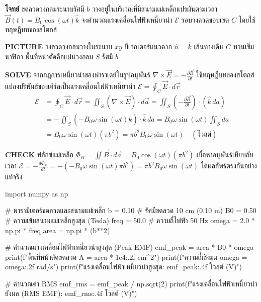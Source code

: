 \begin{mathexample}
\textbf{โจทย์} ขดลวดวงกลมระนาบรัศมี $b$ วางอยู่ในบริเวณที่มีสนามแม่เหล็กแปรผันตามเวลา $\vec{B}(t) = B_0 \cos(\omega t) \hat{k}$ จงคำนวณแรงเคลื่อนไฟฟ้าเหนี่ยวนำ $\mathcal{E}$ รอบวงลวดขอบเขต $C$ โดยใช้ทฤษฎีบทของสโตกส์

\vspace{0.2cm}
\textbf{PICTURE} วงลวดวงกลมวางในระนาบ $xy$ มีเวกเตอร์แนวฉาก $\hat{n} = \hat{k}$ เส้นทางเดิน $C$ ทวนเข็มนาฬิกา พื้นที่หน้าตัดคือแผ่นวงกลม $S$ รัศมี $b$

\vspace{0.2cm}
\textbf{SOLVE}
จากกฎการเหนี่ยวนำของฟาราเดย์ในรูปอนุพันธ์ $\nabla \times \vec{E} = -\frac{\partial \vec{B}}{\partial t}$
ใช้ทฤษฎีบทของสโตกส์แปลงปริพันธ์ของเคิร์ลเป็นแรงเคลื่อนไฟฟ้าเหนี่ยวนำ $\mathcal{E} = \oint_C \vec{E} \cdot d\vec{r}$
\begin{align}
\mathcal{E} &= \oint_C \vec{E} \cdot d\vec{r} = \iint_S (\nabla \times \vec{E}) \cdot d\vec{a} = \iint_S \left(-\frac{\partial \vec{B}}{\partial t}\right) \cdot (\hat{k} \, da) \\
&= -\iint_S \left( -B_0 \omega \sin(\omega t) \hat{k} \right) \cdot \hat{k} \, da = B_0 \omega \sin(\omega t) \iint_S da \\
&= B_0 \omega \sin(\omega t) (\pi b^2) = \pi b^2 B_0 \omega \sin(\omega t) \quad (\text{โวลต์})
\end{align}

\vspace{0.2cm}
\textbf{CHECK} ฟลักซ์แม่เหล็ก $\Phi_B = \iint \vec{B} \cdot d\vec{a} = B_0 \cos(\omega t) (\pi b^2)$ เมื่อหาอนุพันธ์เทียบกับเวลา $\mathcal{E} = -\frac{d\Phi_B}{dt} = -(-B_0 \omega \sin(\omega t)\pi b^2) = \pi b^2 B_0 \omega \sin(\omega t)$ ได้ผลลัพธ์ตรงกันอย่างแท้จริง\qedexam

\begin{pythonbox}
import numpy as np

# พารามิเตอร์ขดลวดและสนามแม่เหล็ก
b = 0.10        # รัศมีขดลวด 10 cm (0.10 m)
B0 = 0.50       # ความเข้มสนามแม่เหล็กสูงสุด (Tesla)
freq = 50.0     # ความถี่ไฟฟ้า 50 Hz
omega = 2.0 * np.pi * freq
area = np.pi * (b**2)

# คำนวณแรงเคลื่อนไฟฟ้าเหนี่ยวนำสูงสุด (Peak EMF)
emf_peak = area * B0 * omega
print(f"พื้นที่หน้าตัดขดลวด A = {area * 1e4:.2f} cm^2")
print(f"ความถี่เชิงมุม omega = {omega:.2f} rad/s")
print(f"แรงเคลื่อนไฟฟ้าเหนี่ยวนำสูงสุด: {emf_peak:.4f} โวลต์ (V)")

# คำนวณค่า RMS
emf_rms = emf_peak / np.sqrt(2)
print(f"แรงเคลื่อนไฟฟ้าเหนี่ยวนำยังผล (RMS EMF): {emf_rms:.4f} โวลต์ (V)")
\end{pythonbox}
\end{mathexample}


